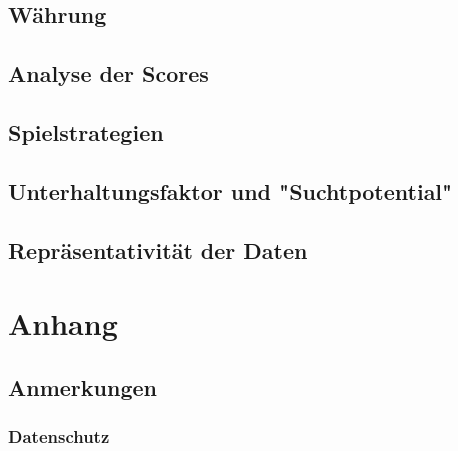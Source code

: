 \documentclass{scrreprt}
\begin{document}
\section{Währung}
\section{Analyse der Scores}
\section{Spielstrategien}
\section{Unterhaltungsfaktor und "Suchtpotential"}
\section{Repräsentativität der Daten}

\chapter{Anhang}
\section{Anmerkungen}
\subsection{Datenschutz}
\end{document}
